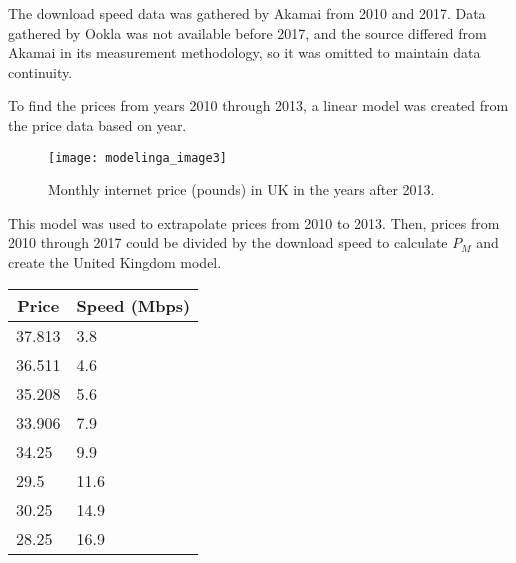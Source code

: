     The download speed data was gathered by Akamai from 2010 and 2017. Data gathered by Ookla was not available before 2017, and the source differed from Akamai in its measurement methodology, so it was omitted to maintain data continuity.

    To find the prices from years 2010 through 2013, a linear model was created from the price data based on year.

	\begin{figure}[htp]
    \centering
    \begin{minipage}{9cm}
    \texttt{[image: modelinga\_image3]}
    \caption{Monthly internet price (pounds) in UK in the years after 2013.}
    \label{fig:3}
    \end{minipage}
    \end{figure}
    
    This model was used to extrapolate prices from 2010 to 2013. Then, prices from 2010 through 2017 could be divided by the download speed to calculate $P_M$ and create the United Kingdom model.

\begin{center}
\begin{tabular}{|l|l|}
\hline
\multicolumn{1}{|c|}{Price}   & \multicolumn{1}{c|}{Speed (Mbps)} \\ \hline
{\color[HTML]{4472C4} 37.813} & 3.8                               \\ \hline
{\color[HTML]{4472C4} 36.511} & 4.6                               \\ \hline
{\color[HTML]{4472C4} 35.208} & 5.6                               \\ \hline
{\color[HTML]{4472C4} 33.906} & 7.9                               \\ \hline
34.25                         & 9.9                               \\ \hline
29.5                          & 11.6                              \\ \hline
30.25                         & 14.9                              \\ \hline
28.25                         & 16.9                              \\ \hline
\end{tabular}
\end{center}

